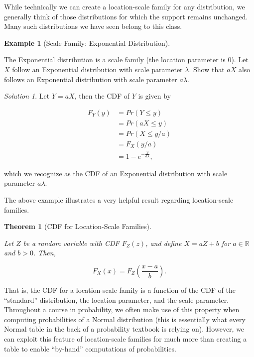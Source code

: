\documentclass[
  letterpaper,
  DIV=11,
  numbers=noendperiod]{scrreprt}
\theoremstyle{plain}
\newtheorem{theorem}{Theorem}[chapter]
\theoremstyle{definition}
\theoremstyle{definition}
\newtheorem{example}{Example}[chapter]
\theoremstyle{remark}
\newtheorem*{solution}{Solution}
\begin{document}
While technically we can create a location-scale family for any
distribution, we generally think of those distributions for which the
support remains unchanged. Many such distributions we have seen belong
to this class.

\begin{example}[Scale Family: Exponential
Distribution]\protect\hypertarget{exm-exponential-scale}{}\label{exm-exponential-scale}

The Exponential distribution is a scale family (the location parameter
is 0). Let \(X\) follow an Exponential distribution with scale parameter
\(\lambda\). Show that \(aX\) also follows an Exponential distribution
with scale parameter \(a\lambda\).

\end{example}

\begin{solution}

Let \(Y = aX\), then the CDF of \(Y\) is given by

\[
\begin{aligned}
  F_Y(y)
    &= Pr(Y \leq y) \\
    &= Pr(aX \leq y) \\
    &= Pr(X \leq y/a) \\
    &= F_X(y/a) \\
    &= 1 - e^{-\frac{y}{a\lambda}},
\end{aligned}
\]

which we recognize as the CDF of an Exponential distribution with scale
parameter \(a\lambda\).

\end{solution}

The above example illustrates a very helpful result regarding
location-scale families.

\begin{theorem}[CDF for Location-Scale
Families]\protect\hypertarget{thm-location-scale}{}\label{thm-location-scale}

Let \(Z\) be a random variable with CDF \(F_Z(z)\), and define
\(X = aZ + b\) for \(a \in \mathbb{R}\) and \(b > 0\). Then,

\[F_X(x) = F_Z\left(\frac{x - a}{b}\right).\]

\end{theorem}

That is, the CDF for a location-scale family is a function of the CDF of
the ``standard'' distribution, the location parameter, and the scale
parameter. Throughout a course in probability, we often make use of this
property when computing probabilities of a Normal distribution (this is
essentially what every Normal table in the back of a probability
textbook is relying on). However, we can exploit this feature of
location-scale families for much more than creating a table to enable
``by-hand'' computations of probabilities.
\end{document}
